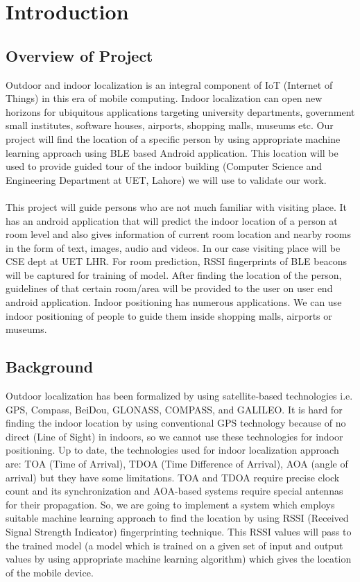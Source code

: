 \documentclass{article}
\begin{document}
\section{Introduction}

\subsection{Overview of Project}
Outdoor and indoor localization is an integral component of  IoT (Internet of Things) in this era of mobile computing. Indoor localization can open new horizons for ubiquitous applications targeting university departments, government small institutes, software houses, airports, shopping malls, museums etc. Our project will find the location of a specific person by using appropriate machine learning approach using BLE based Android application. This location will be used to provide guided tour of the indoor building (Computer Science and Engineering Department at UET, Lahore) we will use to validate our work. 
\\\\
This project will guide persons who are not much familiar with visiting place. It has an android application that will predict the indoor location of a person at room level and also gives information of current room location and nearby rooms in the form of text, images, audio and videos. In our case visiting place will be CSE dept at UET LHR. For room prediction, RSSI fingerprints of BLE beacons will be captured for training of model. After finding the location of the person, guidelines of that certain room/area will be provided to the user on user end android application. Indoor positioning has numerous applications. We can use indoor positioning of people to guide them inside shopping malls, airports or museums. 



\subsection{Background}
Outdoor localization has been formalized by using satellite-based technologies i.e. GPS, Compass, BeiDou, GLONASS, COMPASS, and GALILEO. It is hard for finding the indoor location by using conventional GPS technology\cite{research1} because of no direct (Line of Sight)\cite{research2} in indoors, so we cannot use these technologies for indoor positioning. Up to date, the technologies used for indoor localization approach are: TOA (Time of Arrival), TDOA (Time Difference of Arrival), AOA (angle of arrival) but they have some limitations. TOA and TDOA require precise clock count and its synchronization and AOA-based systems require special antennas for their propagation. So, we are going to implement a system which employs suitable machine learning approach to find the location by using RSSI (Received Signal Strength Indicator) fingerprinting technique. This RSSI values will pass to the trained model (a model which is trained on a given set of input and output values by using appropriate machine learning algorithm) which gives the location of the mobile device.
\end{document}
